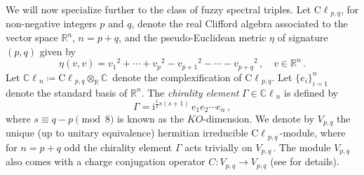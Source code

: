 \documentclass[10pt]{article}
\newcommand{\ci}{\mathrm{i}}
\begin{document}
We will now specialize further to the class of fuzzy spectral triples.
Let ${{\mathrm{C \ell}}_{p,q}}$, for non-negative integers $p$ and  $q$, denote the real Clifford algebra associated to the vector space ${\mathbb{R}^n}$, $n=p+q$, and the pseudo-Euclidean metric ${\eta}$ of signature ${(p,q)}$ given by 
\begin{equation*} 
  {\eta} (v,v) = {{v_1}^2} + \cdots + {{v_p}^2} - {{v_{p+1}}^2} - \cdots -  {{v_{p+q}}^2} \,
 	, \quad v \in \mathbb{R}^n \, .
\end{equation*}
Let ${ {\mathbb{C} \ell}_n \coloneqq {\mathrm{C \ell}}_{p,q} {\otimes_{\mathbb{R}}} \mathbb{C}\,}$ denote the  complexification of  ${{\mathrm{C \ell}}_{p,q}}$. Let ${ {\{ e_i \}}_{i=1}^n }$  denote the  standard  basis of ${\mathbb{R}^n}$. The \emph{chirality element} $\Gamma \in { {\mathbb{C} \ell}_n } $ is defined  by
\begin{equation*}
  \Gamma = \ci^{\frac{1}{2} s (s+1)} \, e_1 e_2 \cdots e_n \, ,
\end{equation*}
where ${s \equiv q-p \pmod{8}}$ is known as the $KO$-dimension. 
We denote by ${V_{p,q}}$ the unique (up to unitary equivalence) hermitian irreducible  ${{\mathrm{C \ell}}_{p,q} \,}$-module, where for $n=p+q$ odd the chirality element $\Gamma$ acts trivially on $V_{p,q}\,$. 
The module $V_{p, q}$ also comes with a charge conjugation operator  ${C : V_{p,q} \to V_{p,q}}$ (see  \cite{Marcolli,Barrett2015} for details).
 
\end{document}
